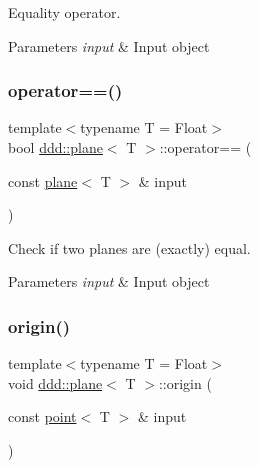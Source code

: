 Equality operator. 


\begin{DoxyParams}{Parameters}
{\em input} & Input object \\
\hline
\end{DoxyParams}
\mbox{\label{classddd_1_1plane_abca107b7efbe4553cfb980cddb7bbf9a}} 
\subsubsection{\texorpdfstring{operator==()}{operator==()}}
{\footnotesize\ttfamily template$<$typename T = Float$>$ \\
bool \hyperlink{classddd_1_1plane}{ddd\+::plane}$<$ T $>$\+::operator== (\begin{DoxyParamCaption}\item[{const \hyperlink{classddd_1_1plane}{plane}$<$ T $>$ \&}]{input }\end{DoxyParamCaption})\hspace{0.3cm}{\ttfamily [inline]}}



Check if two planes are (exactly) equal. 


\begin{DoxyParams}{Parameters}
{\em input} & Input object \\
\hline
\end{DoxyParams}
\mbox{\label{classddd_1_1plane_ac820ca045c22c4f4672adc9efd8b8cf3}} 
\subsubsection{\texorpdfstring{origin()}{origin()}}
{\footnotesize\ttfamily template$<$typename T = Float$>$ \\
void \hyperlink{classddd_1_1plane}{ddd\+::plane}$<$ T $>$\+::origin (\begin{DoxyParamCaption}\item[{const \hyperlink{classddd_1_1point}{point}$<$ T $>$ \&}]{input }\end{DoxyParamCaption})\hspace{0.3cm}{\ttfamily [inline]}}



